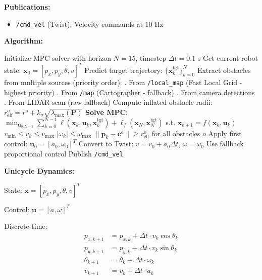 \documentclass[11pt]{article}
\begin{document}
\textbf{Publications:}
\begin{itemize}
    \item \texttt{/cmd\_vel} (Twist): Velocity commands at 10 Hz
\end{itemize}

\textbf{Algorithm:}

\begin{algorithm}[H]
\caption{Model Predictive Control}
\begin{algorithmic}[1]
\State Initialize MPC solver with horizon $N=15$, timestep $\Delta t=0.1$ s
    \State Get current robot state: $\mathbf{x}_0 = [p_x, p_y, \theta, v]^T$
    \State Predict target trajectory: $\{\mathbf{x}_k^{\text{tgt}}\}_{k=0}^{N}$
    \State Extract obstacles from multiple sources (priority order):
        . From \texttt{/local\_map} (Fast Local Grid - highest priority)
        . From \texttt{/map} (Cartographer - fallback)
        . From camera detections
        . From LIDAR scan (raw fallback)
    \State Compute inflated obstacle radii: $r_{\text{eff}}^o = r^o + k_\sigma \sqrt{\lambda_{\max}(\mathbf{P})}$
    \State \textbf{Solve MPC:}
    \State $\min_{\mathbf{u}_{0:N-1}} \sum_{k=0}^{N-1} \ell(\mathbf{x}_k, \mathbf{u}_k, \mathbf{x}_k^{\text{tgt}}) + \ell_f(\mathbf{x}_N, \mathbf{x}_N^{\text{tgt}})$
    \State s.t. $\mathbf{x}_{k+1} = f(\mathbf{x}_k, \mathbf{u}_k)$
    \State \phantom{s.t.} $v_{\min} \leq v_k \leq v_{\max}$
    \State \phantom{s.t.} $|\omega_k| \leq \omega_{\max}$
    \State \phantom{s.t.} $\|\mathbf{p}_k - \mathbf{c}^o\| \geq r_{\text{eff}}^o$ for all obstacles $o$
        \State Apply first control: $\mathbf{u}_0 = [a_0, \omega_0]^T$
        \State Convert to Twist: $v = v_0 + a_0 \Delta t$, $\omega = \omega_0$
    \Else
        \State Use fallback proportional control
    \EndIf
    \State Publish \texttt{/cmd\_vel}
\EndLoop
\end{algorithmic}
\end{algorithm}

\textbf{Unicycle Dynamics:}

State: $\mathbf{x} = [p_x, p_y, \theta, v]^T$

Control: $\mathbf{u} = [a, \omega]^T$

Discrete-time:
\begin{align}
p_{x,k+1} &= p_{x,k} + \Delta t \cdot v_k \cos\theta_k \\
p_{y,k+1} &= p_{y,k} + \Delta t \cdot v_k \sin\theta_k \\
\theta_{k+1} &= \theta_k + \Delta t \cdot \omega_k \\
v_{k+1} &= v_k + \Delta t \cdot a_k
\end{align}
\end{document}
